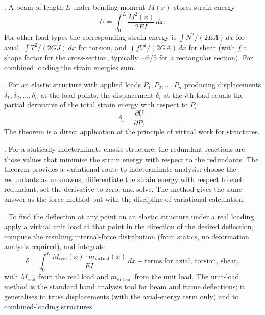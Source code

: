 . A beam of length $L$ under
bending moment $M(x)$ stores strain energy
\[
U = \int_0^L \frac{M^2(x)}{2 EI} \,dx.
\]
For other load types the corresponding strain energy is $\int N^2/(2
EA) \,dx$ for axial, $\int T^2/(2GJ) \,dx$ for torsion, and $\int
fV^2/(2 GA) \,dx$ for shear (with $f$ a shape factor for the
cross-section, typically $\sim 6/5$ for a rectangular section). For
combined loading the strain energies sum.

. For an elastic structure with
applied loads $P_1, P_2, \ldots, P_n$ producing displacements $\delta_1,
\delta_2, \ldots, \delta_n$ at the load points, the displacement
$\delta_i$ at the $i$th load equals the partial derivative of the
total strain energy with respect to $P_i$:
\[
\delta_i = \frac{\partial U}{\partial P_i}.
\]
The theorem is a direct application of the principle of virtual work
for structures.

. For a statically
indeterminate elastic structure, the redundant reactions are those
values that minimise the strain energy with respect to the
redundants. The theorem provides a variational route to
indeterminate analysis: choose the redundants as unknowns,
differentiate the strain energy with respect to each redundant, set
the derivative to zero, and solve. The method gives the same
answer as the force method but with the discipline of variational
calculation.

. To find the deflection at any point
on an elastic structure under a real loading, apply a virtual unit
load at that point in the direction of the desired deflection, compute
the resulting internal-force distribution (from statics, no
deformation analysis required), and integrate
\[
\delta = \int_0^L \frac{M_{\text{real}}(x) \cdot m_{\text{virtual}}(x)
}{EI} \,dx + \text{terms for axial, torsion, shear},
\]
with $M_{\text{real}}$ from the real load and $m_{\text{virtual}}$
from the unit load. The unit-load method is the standard hand
analysis tool for beam and frame deflections; it generalises to
truss displacements (with the axial-energy term only) and to
combined-loading structures.

